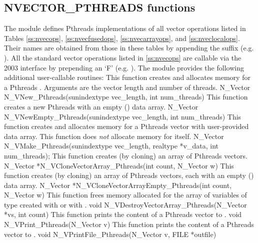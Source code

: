 \subsection{NVECTOR\_PTHREADS functions}
\label{ss:nvec_pthreads_functions}

The {\nvecpthreads} module defines Pthreads implementations of all vector operations listed
in Tables \ref{ss:nvecops}, \ref{ss:nvecfusedops}, \ref{ss:nvecarrayops},
and \ref{ss:nveclocalops}. Their names are
obtained from those in these tables by appending the suffix 
(e.g. ).
All the standard vector operations listed in \ref{ss:nvecops} are callable via
the {\F} 2003 interface by prepending an `F' (e.g. ).
The module {\nvecpthreads} provides the following additional user-callable routines:
{
  This function creates and allocates memory for a Pthreads .
  Arguments are the vector length and number of threads.
}
{
  N\_Vector N\_VNew\_Pthreads(sunindextype vec\_length, int num\_threads)
}
{
  This function creates a new Pthreads  with an empty () data array.
}
{
  N\_Vector N\_VNewEmpty\_Pthreads(sunindextype vec\_length, int num\_threads)
}
{
  This function creates and allocates memory for a Pthreads vector
  with user-provided data array. This function does {\em not} allocate memory
  for  itself.
}
{
  N\_Vector N\_VMake\_Pthreads(sunindextype vec\_length, realtype *v\_data,
  int num\_threads);
}
{
  This function creates (by cloning) an array of  Pthreads vectors.
}
{
  N\_Vector *N\_VCloneVectorArray\_Pthreads(int count, N\_Vector w)
}
{
  This function creates (by cloning) an array of  Pthreads vectors, each with an
  empty () data array.
}
{
  N\_Vector *N\_VCloneVectorArrayEmpty\_Pthreads(int count, N\_Vector w)
}
{
  This function frees memory allocated for the array of  variables of type
   created with  or with \newline
  .
}
{
  void N\_VDestroyVectorArray\_Pthreads(N\_Vector *vs, int count)
}
{
  This function prints the content of a Pthreads vector to .
}
{
  void N\_VPrint\_Pthreads(N\_Vector v)
}
{
  This function prints the content of a Pthreads vector to .
}
{
  void N\_VPrintFile\_Pthreads(N\_Vector v, FILE *outfile)
}

